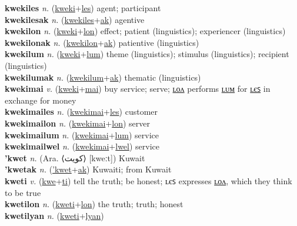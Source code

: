 \textbf{kwekiles} \textit{n.} (\hyperref[kweki]{kweki}+\hyperref[les]{les})
agent; participant \label{kwekiles} \\
\textbf{kwekilesak} \textit{n.} (\hyperref[kwekiles]{kwekiles}+\hyperref[ak]{ak})
agentive \label{kwekilesak} \\
\textbf{kwekilon} \textit{n.} (\hyperref[kweki]{kweki}+\hyperref[lon]{lon})
effect; patient (linguistics); experiencer (linguistics) \label{kwekilon} \\
\textbf{kwekilonak} \textit{n.} (\hyperref[kwekilon]{kwekilon}+\hyperref[ak]{ak})
patientive (linguistics) \label{kwekilonak} \\
\textbf{kwekilum} \textit{n.} (\hyperref[kweki]{kweki}+\hyperref[lum]{lum})
theme (linguistics); stimulus (linguistics); recipient (linguistics) \label{kwekilum} \\
\textbf{kwekilumak} \textit{n.} (\hyperref[kwekilum]{kwekilum}+\hyperref[ak]{ak})
thematic (linguistics) \label{kwekilumak} \\
\textbf{kwekimai} \textit{v.} (\hyperref[kweki]{kweki}+\hyperref[mai]{mai})
buy service; serve; \hyperref[kwekimailon]{ʟᴏᴧ} performs \hyperref[kwekimailum]{ʟᴜᴍ} for \hyperref[kwekimailes]{ʟєꜱ} in exchange for money \label{kwekimai} \\
\textbf{kwekimailes} \textit{n.} (\hyperref[kwekimai]{kwekimai}+\hyperref[les]{les})
customer \label{kwekimailes} \\
\textbf{kwekimailon} \textit{n.} (\hyperref[kwekimai]{kwekimai}+\hyperref[lon]{lon})
server \label{kwekimailon} \\
\textbf{kwekimailum} \textit{n.} (\hyperref[kwekimai]{kwekimai}+\hyperref[lum]{lum})
service \label{kwekimailum} \\
\textbf{kwekimailwel} \textit{n.} (\hyperref[kwekimai]{kwekimai}+\hyperref[lwel]{lwel})
service \label{kwekimailwel} \\
\textbf{'kwet} \textit{n.} (Ara. ⟨كويت⟩ [kweːt])
Kuwait \label{'kwet} \\
\textbf{'kwetak} \textit{n.} (\hyperref['kwet]{'kwet}+\hyperref[ak]{ak})
Kuwaiti; from Kuwait \label{'kwetak} \\
\textbf{kweti} \textit{v.} (\hyperref[kwe]{kwe}+\hyperref[ti]{ti})
tell the truth; be honest; ʟєꜱ expresses \hyperref[kwetilon]{ʟᴏᴧ}, which they think to be true \label{kweti} \\
\textbf{kwetilon} \textit{n.} (\hyperref[kweti]{kweti}+\hyperref[lon]{lon})
the truth; truth; honest \label{kwetilon} \\
\textbf{kwetilyan} \textit{n.} (\hyperref[kweti]{kweti}+\hyperref[lyan]{lyan})
